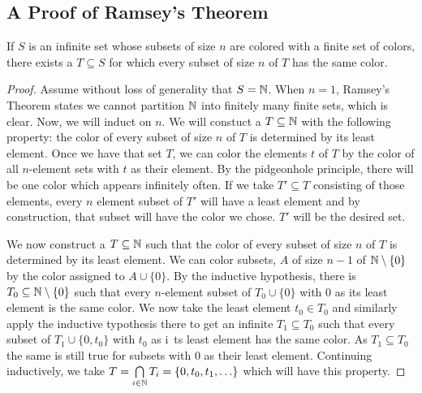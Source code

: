 \subsection{A Proof of Ramsey's Theorem}

\begin{theorem}\label{ramseys_theorem}
If \(S\) is an infinite set whose subsets of size \(n\) are colored with a finite set of colors, there exists a \(T \subseteq S\) for which every subset of size \(n\) of \(T\) has the same color.
\end{theorem}

\begin{proof}
Assume without loss of generality that \(S = \mathbb{N}\).
When \(n=1\), Ramsey's Theorem states we cannot partition \(\mathbb{N}\) into finitely many finite sets, which is clear.
Now, we will induct on \(n\).
We will constuct a \(T \subseteq \mathbb{N}\) with the following property: the color of every subset of size \(n\) of \(T\) is determined by its least element.
Once we have that set \(T\), we can color the elements \(t\) of \(T\) by the color of all \(n\)-element sets with \(t\) as their element.
By the pidgeonhole principle, there will be one color which appears infinitely often.
If we take \(T' \subseteq T\) consisting of those elements, every \(n\) element subset of \(T'\) will have a least element and by construction, that subset will have the color we chose.
\(T'\) will be the desired set.

We now construct a \(T \subseteq \mathbb{N}\) such that the color of every subset of size \(n\) of \(T\) is determined by its least element.
We can color subsets, \(A\) of size \(n-1\) of \(\mathbb{N} \setminus \{0\}\) by the color assigned to \(A \cup \{0\}\).
By the inductive hypothesis, there is \(T_0 \subseteq \mathbb{N} \setminus \{0\}\) such that every \(n\)-element subset of \(T_0 \cup \{0\}\) with 0 as its least element is the same color.
We now take the least element \(t_0 \in T_0\) and similarly apply the inductive typothesis there to get an infinite \(T_1 \subseteq T_0\) such that every subset of \(T_1 \cup \{0, t_0\}\) with \(t_0\) as i\
ts least element has the same color.
As \(T_1 \subseteq T_0\) the same is still true for subsets with \(0\) as their least element.
Continuing inductively, we take \(T = \bigcap\limits_{i \in \mathbb{N}}T_i = \{0, t_0, t_1, \ldots\}\) which will have this property.
\end{proof}


